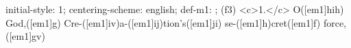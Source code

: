 initial-style: 1;
centering-scheme: english;
def-m1: \grealign;
(f3) <c>1.</c> O([em1]hih) God,([em1]g) Cre-([em1]iv)a-([em1]ij)tion's([em1]ji) se-([em1]h)cret([em1]f) force,([em1]gv)